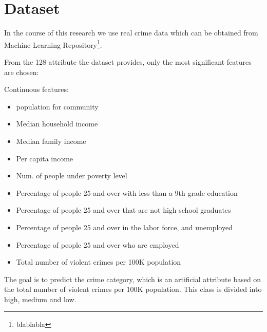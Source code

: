 \section{Dataset}

In the course of this research we use real crime data which can be obtained from Machine Learning Repository\footnote{blablabla}.

From the 128 attribute the dataset provides, only the most significant features are chosen:

Continuous features:
\begin{itemize}
	\item population for community
	\item Median household income
	\item Median family income
	\item Per capita income
	\item Num. of people under poverty level
	\item Percentage of people 25 and over with less than a 9th grade education
	\item Percentage of people 25 and over that are not high school graduates
	\item Percentage of people 25 and over in the labor force, and unemployed
	\item Percentage of people 25 and over who are employed
	\item Total number of violent crimes per 100K population
\end{itemize}

The goal is to predict the crime category, which is an artificial attribute based on the total number of violent crimes per 100K population. This class is divided into high, medium and low. 